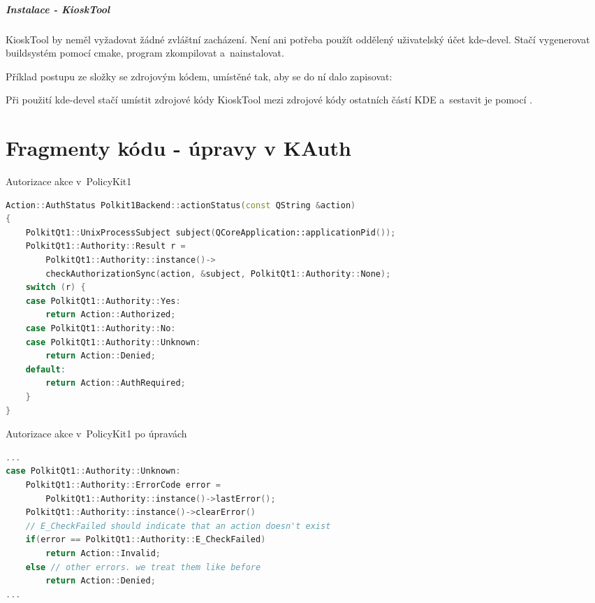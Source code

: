 \paragraph{Instalace - KioskTool}
KioskTool by neměl vyžadovat žádné zvláštní zacházení. Není ani potřeba použít oddělený uživatelský účet kde-devel. Stačí vygenerovat buildsystém pomocí cmake, program zkompilovat a~nainstalovat.

Příklad postupu ze složky se zdrojovým kódem, umístěné tak, aby se do ní dalo zapisovat:

\noindent
{}

\noindent
{}

\noindent
{}

\noindent
{}

Při použití kde-devel stačí umístit zdrojové kódy KioskTool mezi zdrojové kódy ostatních částí KDE a~sestavit je pomocí .

\chapter{Fragmenty kódu - úpravy v KAuth}
\begin{mylisting}
\caption{Autorizace akce v~PolicyKit1}
\label{kauth-oldmethod}
\begin{lstlisting}[language=C++]
Action::AuthStatus Polkit1Backend::actionStatus(const QString &action)
{
    PolkitQt1::UnixProcessSubject subject(QCoreApplication::applicationPid());
    PolkitQt1::Authority::Result r =
        PolkitQt1::Authority::instance()->
        checkAuthorizationSync(action, &subject, PolkitQt1::Authority::None);
    switch (r) {
    case PolkitQt1::Authority::Yes:
        return Action::Authorized;
    case PolkitQt1::Authority::No:
    case PolkitQt1::Authority::Unknown:
        return Action::Denied;
    default:
        return Action::AuthRequired;
    }
}
\end{lstlisting}
\end{mylisting}
\begin{mylisting}
\caption{Autorizace akce v~PolicyKit1 po úpravách}
\label{kauth-newmethod}
\begin{lstlisting}[language=C++]
...
case PolkitQt1::Authority::Unknown:
    PolkitQt1::Authority::ErrorCode error =
        PolkitQt1::Authority::instance()->lastError();
    PolkitQt1::Authority::instance()->clearError()
    // E_CheckFailed should indicate that an action doesn't exist
    if(error == PolkitQt1::Authority::E_CheckFailed)
        return Action::Invalid;
    else // other errors. we treat them like before
        return Action::Denied;
...
\end{lstlisting}
\end{mylisting}

